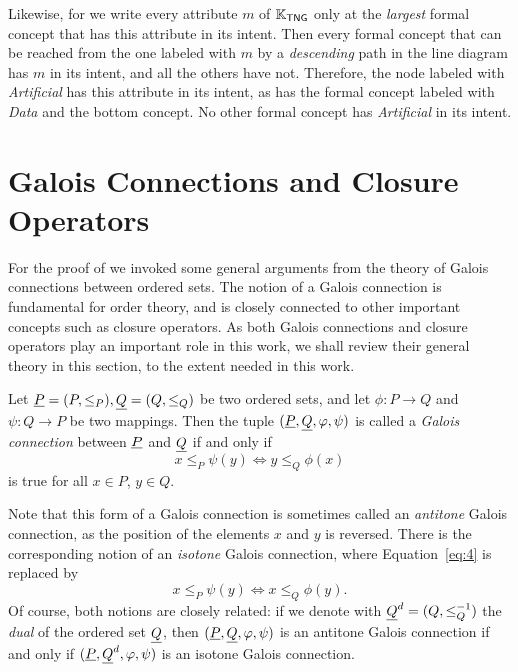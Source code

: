 \begin{Example}
  Likewise, for we write every attribute $m$ of ${\mathbb{K}}_{\mathsf{TNG}}$ only at the
  \emph{largest} formal concept that has this attribute in its intent.  Then every formal
  concept that can be reached from the one labeled with $m$ by a \emph{descending} path in
  the line diagram has $m$ in its intent, and all the others have not.  Therefore, the
  node labeled with \emph{Artificial} has this attribute in its intent, as has the formal
  concept labeled with \emph{Data} and the bottom concept.  No other formal concept has
  \emph{Artificial} in its intent.
\end{Example}

\section{Galois Connections and Closure Operators}
\label{sec:galois-connections}

For the proof of  we invoked some general
arguments from the theory of Galois connections between ordered sets.  The notion of a
Galois connection is fundamental for order theory, and is closely connected to other
important concepts such as closure operators.  As both Galois connections and closure
operators play an important role in this work, we shall review their general theory in
this section, to the extent needed in this work.

\begin{Definition}
  \label{def:galois-connection}
  Let ${\underline{P}} = (P, \leq_P), {\underline{Q}} = (Q, \leq_Q)$ be two ordered sets, and let $\phi
  \colon P \to Q$ and $\psi \colon Q \to P$ be two mappings.  Then the tuple $({\underline{P}},
  {\underline{Q}}, \varphi, \psi)$ is called a \emph{Galois connection} between ${\underline{P}}$ and ${\underline{Q}}$
  if and only if
  \begin{equation}
    \label{eq:4}
    x \leq_P \psi(y) \iff y \leq_Q \phi(x)
  \end{equation}
  is true for all $x \in P$, $y \in Q$.
\end{Definition}

Note that this form of a Galois connection is sometimes called an \emph{antitone} Galois
connection, as the position of the elements $x$ and $y$ is reversed.  There is the
corresponding notion of an \emph{isotone} Galois connection, where Equation~\eqref{eq:4}
is replaced by
\begin{equation}
  \label{eq:5}
  x \leq_P \psi(y) \iff x \leq_Q \phi(y).
\end{equation}
Of course, both notions are closely related: if we denote with ${\underline{Q}}^d = (Q,
\leq_Q^{-1})$ the \emph{dual} of the ordered set ${\underline{Q}}$, then $({\underline{P}}, {\underline{Q}}, \varphi,
\psi)$ is an antitone Galois connection if and only if $({\underline{P}}, {\underline{Q}}^d, \varphi, \psi)$ is
an isotone Galois connection.

